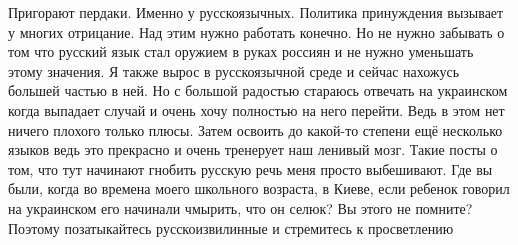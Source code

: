

Пригорают пердаки. Именно у русскоязычных. Политика принуждения вызывает у
многих отрицание. Над этим нужно работать конечно. Но не нужно забывать о том
что русский язык стал оружием в руках россиян и не нужно уменьшать этому
значения. Я также вырос в русскоязычной среде и сейчас нахожусь большей частью
в ней. Но с большой радостью стараюсь отвечать на украинском когда выпадает
случай и очень хочу полностью на него перейти. Ведь в этом нет ничего плохого
только плюсы. Затем освоить до какой-то степени ещё несколько языков ведь это
прекрасно и очень тренерует наш ленивый мозг. Такие посты о том, что тут
начинают гнобить русскую речь меня просто выбешивают. Где вы были, когда во
времена моего школьного возраста, в Киеве, если ребенок говорил на украинском
его начинали чмырить, что он селюк? Вы этого не помните? Поэтому позатыкайтесь
русскоизвилинные и стремитесь к просветлению

